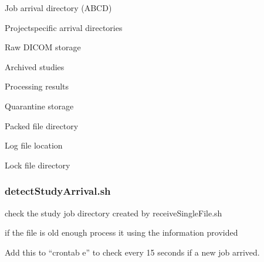 \documentclass[letterpaper,10pt,english]{sphinxmanual}
\begin{document}
\begin{DUlineblock}{0em}
\item[] \sphinxhyphen{}  \sphinxhyphen{} Job arrival directory (ABCD)
\item[] \sphinxhyphen{}  \sphinxhyphen{} Project\sphinxhyphen{}specific arrival directories
\item[] \sphinxhyphen{}  \sphinxhyphen{} Raw DICOM storage
\item[] \sphinxhyphen{}  \sphinxhyphen{} Archived studies
\item[] \sphinxhyphen{}  \sphinxhyphen{} Processing results
\item[] \sphinxhyphen{}  \sphinxhyphen{} Quarantine storage
\item[] \sphinxhyphen{}  \sphinxhyphen{} Packed file directory
\item[] \sphinxhyphen{}  \sphinxhyphen{} Log file location
\item[] \sphinxhyphen{}  \sphinxhyphen{} Lock file directory
\end{DUlineblock}


\subsubsection{detectStudyArrival.sh}
\label{\detokenize{Architecture/scripts/detectStudyArrival:detectstudyarrival-sh}}
\sphinxAtStartPar
check the study job directory created by receiveSingleFile.sh

\sphinxAtStartPar
if the file is old enough process it using the information provided

\sphinxAtStartPar
Add this to “crontab \sphinxhyphen{}e” to check every 15 seconds if a new job arrived.

\sphinxAtStartPar
{}

\sphinxAtStartPar
{}
\end{document}
